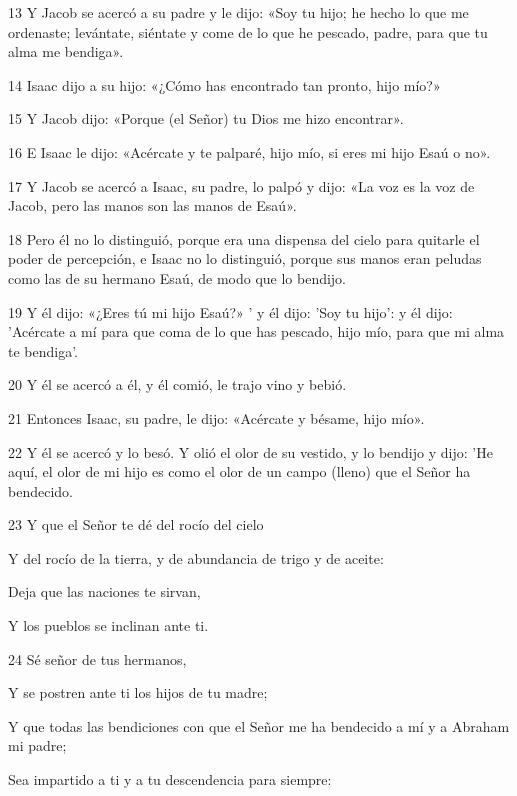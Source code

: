 \par 13 Y Jacob se acercó a su padre y le dijo: «Soy tu hijo; he hecho lo que me ordenaste; levántate, siéntate y come de lo que he pescado, padre, para que tu alma me bendiga».
\par 14 Isaac dijo a su hijo: «¿Cómo has encontrado tan pronto, hijo mío?»
\par 15 Y Jacob dijo: «Porque (el Señor) tu Dios me hizo encontrar».
\par 16 E Isaac le dijo: «Acércate y te palparé, hijo mío, si eres mi hijo Esaú o no».
\par 17 Y Jacob se acercó a Isaac, su padre, lo palpó y dijo: «La voz es la voz de Jacob, pero las manos son las manos de Esaú».
\par 18 Pero él no lo distinguió, porque era una dispensa del cielo para quitarle el poder de percepción, e Isaac no lo distinguió, porque sus manos eran peludas como las de su hermano Esaú, de modo que lo bendijo.
\par 19 Y él dijo: «¿Eres tú mi hijo Esaú?» ' y él dijo: 'Soy tu hijo': y él dijo: 'Acércate a mí para que coma de lo que has pescado, hijo mío, para que mi alma te bendiga'.
\par 20 Y él se acercó a él, y él comió, le trajo vino y bebió.
\par 21 Entonces Isaac, su padre, le dijo: «Acércate y bésame, hijo mío».
\par 22 Y él se acercó y lo besó. Y olió el olor de su vestido, y lo bendijo y dijo: 'He aquí, el olor de mi hijo es como el olor de un campo (lleno) que el Señor ha bendecido.
\par    
\par 23 Y que el Señor te dé del rocío del cielo  
\par     Y del rocío de la tierra, y de abundancia de trigo y de aceite:
\par    
\par     Deja que las naciones te sirvan,  
\par     Y los pueblos se inclinan ante ti.
\par    
\par 24 Sé señor de tus hermanos,  
\par     Y se postren ante ti los hijos de tu madre;
\par    
\par     Y que todas las bendiciones con que el Señor me ha bendecido a mí y a Abraham mi padre;  
\par     Sea impartido a ti y a tu descendencia para siempre:
